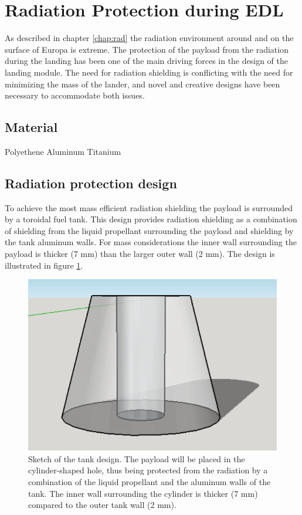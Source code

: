 \section{Radiation Protection during EDL}

As described in chapter \ref{chap:rad} the radiation environment around and on the surface of Europa is extreme. The protection of the payload from the radiation during the landing has been one of the main driving forces in the design of the landing module. The need for radiation shielding is conflicting with the need for minimizing the mass of the lander, and novel and creative designs have been necessary to accommodate both issues.


\subsection{Material}
Polyethene
Aluminum 
Titanium

\subsection{Radiation protection design}
To achieve the most mass efficient radiation shielding the payload is surrounded by a toroidal fuel tank. This design provides radiation shielding as a combination of shielding from the liquid propellant surrounding the payload and shielding by the tank aluminum walls. For mass considerations the inner wall surrounding the payload is thicker (7 mm) than the larger outer wall (2 mm). The design is illustrated in figure \ref{fig:tankdesign}.

\begin{figure}[htb]
\begin{center}
\includegraphics[scale=0.7]{figures/navtheory/tank}
\caption{Sketch of the tank design. The payload will be placed in the cylinder-shaped hole, thus being protected from the radiation by a combination of the liquid propellant and the aluminum walls of the tank. The inner wall surrounding the cylinder is thicker (7 mm) compared to the outer tank wall (2 mm). }
\label{fig:tankdesign}
\end{center}
\end{figure}

